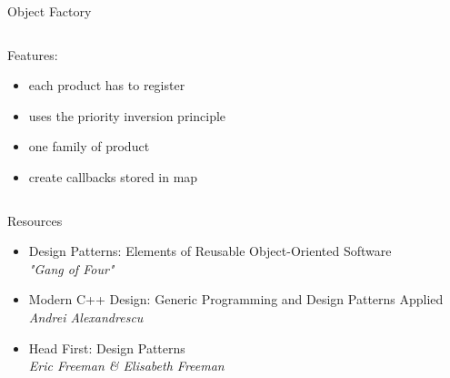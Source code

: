 \documentclass{beamer}
\begin{document}
\begin{frame}{Object Factory}
  \begin{columns}
    \begin{column}{.47\textwidth}
      \begin{block}{Features:}
        \begin{itemize}
          \item each product has to register
          \item uses the priority inversion principle
          \item one family of product
          \item create callbacks stored in map
        \end{itemize}
      \end{block}
    \end{column}
    \begin{column}{.47\textwidth}
      \resizebox{\textwidth}{!}{ %
        
      }
    \end{column}
  \end{columns}
\end{frame}

\begin{frame}{Resources}
\begin{itemize}
  \item Design Patterns: Elements of Reusable Object-Oriented Software\\
    \small{\textit{"Gang of Four"}}
  \item Modern C++ Design: Generic Programming and Design Patterns Applied\\
    \small{\textit{Andrei Alexandrescu}}
  \item Head First: Design Patterns \\
    \small{\textit{Eric Freeman \& Elisabeth Freeman}}
\end{itemize}
\end{frame}

\begin{frame}
\end{frame}
\end{document}
